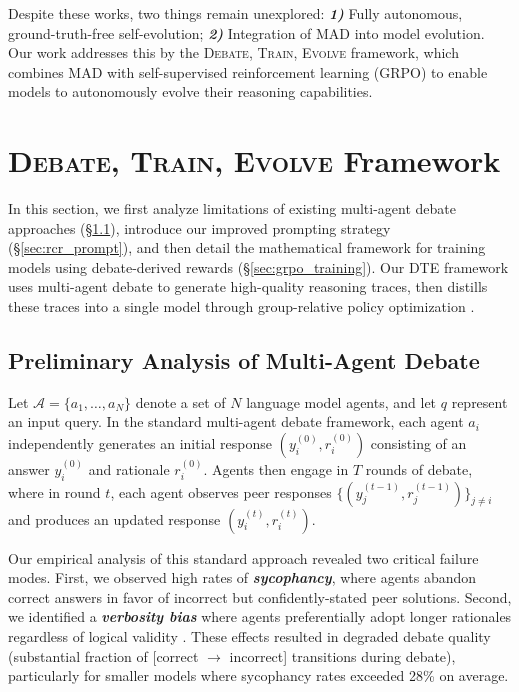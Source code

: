 \documentclass[11pt]{article}
\begin{document}
Despite these works, two things remain unexplored: \textbf{\textit{1)}} Fully autonomous, ground-truth-free self-evolution; \textbf{\textit{2)}} Integration of MAD into model evolution. Our work addresses this by the \textsc{Debate, Train, Evolve} framework, which combines MAD with self-supervised reinforcement learning (GRPO) to enable models to autonomously evolve their reasoning capabilities.



\section{\textsc{Debate, Train, Evolve} Framework}
\label{sec:dte_framework}

In this section, we first analyze limitations of existing multi-agent debate approaches (§\ref{sec:mad_analysis}), introduce our improved prompting strategy (§\ref{sec:rcr_prompt}), and then detail the mathematical framework for training models using debate-derived rewards (§\ref{sec:grpo_training}). Our DTE framework uses multi-agent debate to generate high-quality reasoning traces, then distills these traces into a single model through group-relative policy optimization \cite{shao2024deepseekmathpushinglimitsmathematical}.

\subsection{Preliminary Analysis of Multi-Agent Debate}
\label{sec:mad_analysis}

Let $\mathcal{A} = \{a_1, \ldots, a_N\}$ denote a set of $N$ language model agents, and let $q$ represent an input query. In the standard multi-agent debate framework, each agent $a_i$ independently generates an initial response $(y_i^{(0)}, r_i^{(0)})$ consisting of an answer $y_i^{(0)}$ and rationale $r_i^{(0)}$. Agents then engage in $T$ rounds of debate, where in round $t$, each agent observes peer responses $\{(y_j^{(t-1)}, r_j^{(t-1)})\}_{j \neq i}$ and produces an updated response $(y_i^{(t)}, r_i^{(t)})$.

Our empirical analysis of this standard approach revealed two critical failure modes. First, we observed high rates of \textbf{\emph{sycophancy}}, where agents abandon correct answers in favor of incorrect but confidently-stated peer solutions. Second, we identified a \textbf{\emph{verbosity bias}} where agents preferentially adopt longer rationales regardless of logical validity \cite{saito2023verbosity}. These effects resulted in degraded debate quality (substantial fraction of [correct $\rightarrow$ incorrect] transitions during debate), particularly for smaller models where sycophancy rates exceeded 28\% on average.
\end{document}
